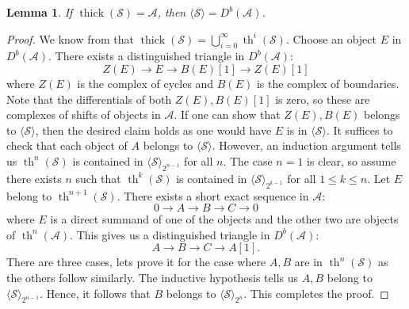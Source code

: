 \documentclass[11pt]{amsart}
\theoremstyle{plain}
\newtheorem{lemma}[theorem]{Lemma}
\theoremstyle{definition}
\numberwithin{equation}{section}
\numberwithin{theorem}{section}
\begin{document}
\begin{lemma}\label{lem:abelian_thick_to_bounded_derived_thick}
    If $\operatorname{thick}(\mathcal{S})=\mathcal{A}$, then $\langle \mathcal{S} \rangle = D^b(\mathcal{A})$.
\end{lemma}

\begin{proof}
    We know from  that $\operatorname{thick}(\mathcal{S})= \bigcup^\infty_{i=0} \operatorname{th}^i (\mathcal{S})$. Choose an object $E$ in $D^b (\mathcal{A})$. There exists a distinguished triangle in $D^b (\mathcal{A})$:
    \begin{displaymath}
        Z(E) \to E \to B(E)[1] \to Z(E)[1]
    \end{displaymath}
    where $Z(E)$ is the complex of cycles and $B(E)$ is the complex of boundaries. Note that the differentials of both $Z(E),B(E)[1]$ is zero, so these are complexes of shifts of objects in $\mathcal{A}$. If one can show that $Z(E),B(E)$ belongs to $\langle \mathcal{S} \rangle$, then the desired claim holds as one would have $E$ is in $\langle \mathcal{S} \rangle$. It suffices to check that each object of $A$ belongs to $\langle \mathcal{S} \rangle$. However, an induction argument tells us $\operatorname{th}^n (\mathcal{S})$ is contained in $\langle \mathcal{S} \rangle_{2^{n-1}}$ for all $n$. The case $n=1$ is clear, so assume there exists $n$ such that $\operatorname{th}^k (\mathcal{S})$ is contained in $\langle \mathcal{S} \rangle_{2^{k-1}}$ for all $1\leq k \leq n$. Let $E$ belong to $\operatorname{th}^{n+1} (\mathcal{S})$. There exists a short exact sequence in $\mathcal{A}$:
    \begin{displaymath}
        0 \to A \to B \to C \to 0
    \end{displaymath}
    where $E$ is a direct summand of one of the objects and the other two are objects of $\operatorname{th}^n (\mathcal{A})$. This gives us a distinguished triangle in $D^b (\mathcal{A})$:
    \begin{displaymath}
        A \to B \to C \to A[1].
    \end{displaymath}
    There are three cases, lets prove it for the case where $A,B$ are in $\operatorname{th}^n (\mathcal{S})$ as the others follow similarly. The inductive hypothesis tells us $A,B$ belong to $\langle \mathcal{S} \rangle_{2^{n-1}}$. Hence, it follows that $B$ belongs to $\langle \mathcal{S} \rangle_{2^n}$. This completes the proof.
\end{proof}
\end{document}
